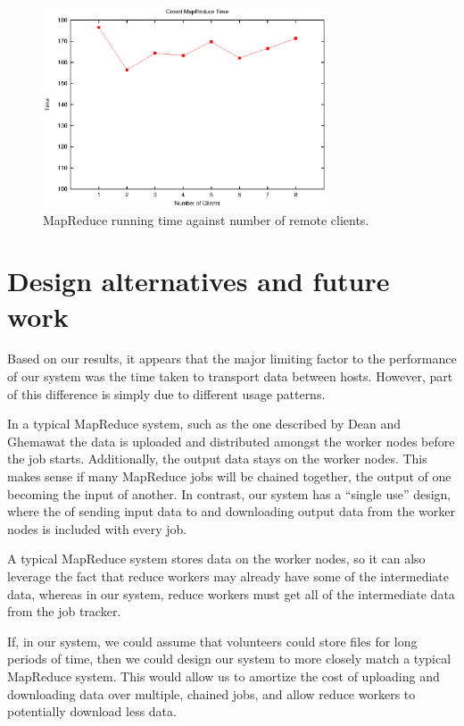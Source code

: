 \documentclass{article} %
\begin{document}
\begin{figure}[h]
  \centering
    \includegraphics[width=0.75\textwidth]{remote}
    \caption{MapReduce running time against number of remote clients.}
    \label{remote}
\end{figure}

\section{Design alternatives and future work}
Based on our results, it appears that the major limiting factor to the
performance of our system was the time taken to transport data between hosts.
However, part of this difference is simply due to different usage patterns.

In a typical MapReduce system, such as the one described by Dean and Ghemawat
\cite{dean2008mapreduce} the data is uploaded and distributed amongst the
worker nodes before the job starts. Additionally, the output data stays on the
worker nodes. This makes sense if many MapReduce jobs will be chained together,
the output of one becoming the input of another. In contrast, our system has a
``single use'' design, where the of sending input data to and downloading
output data from the worker nodes is included with every job.

A typical MapReduce system stores data on the worker nodes, so it can also
leverage the fact that reduce workers may already have some of the intermediate
data, whereas in our system, reduce workers must get all of the intermediate
data from the job tracker.

If, in our system, we could assume that volunteers could store files for long
periods of time, then we could design our system to more closely match a typical
MapReduce system. This would allow us to amortize the cost of uploading and
downloading data over multiple, chained jobs, and allow reduce workers to
potentially download less data.
\end{document}
